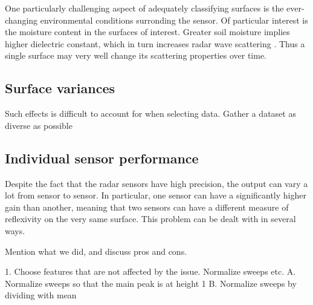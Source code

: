 \documentclass[a4paper, 12pt]{article}
\begin{document}
One particularly challenging aspect of adequately classifying surfaces is the ever-changing environmental conditions surronding the sensor. Of particular interest is the moisture content in the surfaces of interest. Greater soil moisture implies higher dielectric constant, which in turn increases radar wave scattering \citep{rappaport_2006}. Thus a single surface may very well change its scattering properties over time. 


\subsection{Surface variances}

Such effects is difficult to account for when selecting data. Gather a dataset as diverse as possible

\subsection{Individual sensor performance}
Despite the fact that the radar sensors have high precision, the output can vary a lot from sensor to sensor. In particular, one sensor can have a significantly higher gain than another, meaning that two sensors can have a different measure of reflexivity on the very same surface. This problem can be dealt with in several ways. 

Mention what we did, and discuss pros and cons.

1. Choose features that are not affected by the issue. Normalize sweeps etc.
	A. Normalize sweeps so that the main peak is at height 1
	B. Normalize sweeps by dividing with mean 

\newpage


\end{document}
